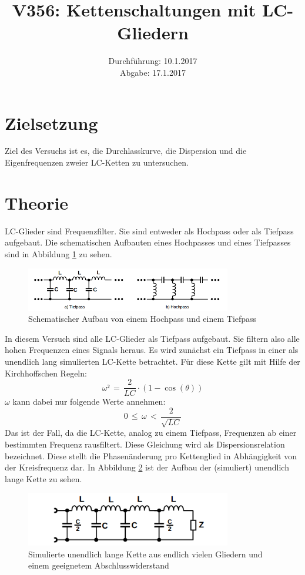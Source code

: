 \documentclass[
  bibliography=totoc,     %
  captions=tableheading,  %
  titlepage=firstiscover, %
]{scrartcl}
\title{V356: Kettenschaltungen mit LC-Gliedern}
\author{
  Simon Schulte
  \texorpdfstring{
    \\
    \href{mailto:simon.schulte@udo.edu}{simon.schulte@udo.edu}
  }{}
  \texorpdfstring{\and}{, }
  Tim Sedlaczek
  \texorpdfstring{
    \\
    \href{mailto:tim.sedlaczek@udo.edu}{tim.sedlaczek@udo.edu}
  }{}
}
\date{Durchführung: 10.1.2017\\
      Abgabe: 17.1.2017}
\begin{document}
\maketitle
\thispagestyle{empty}
\tableofcontents
\newpage
\section{Zielsetzung}
\label{zielsetzung}
Ziel des Versuchs ist es, die Durchlasskurve, die Dispersion und die
Eigenfrequenzen zweier LC-Ketten zu untersuchen.
\section{Theorie}
\label{theorie}
LC-Glieder sind Frequenzfilter. Sie sind entweder als Hochpass oder als Tiefpass
aufgebaut. Die schematischen Aufbauten eines Hochpasses und eines Tiefpasses sind
in Abbildung \ref{fig:V3563} zu sehen.
\begin{figure}[htb]
  \centering
  \includegraphics[width=0.8\textwidth]{V3563.png}
  \caption{Schematischer Aufbau von einem Hochpass und einem Tiefpass}
  \label{fig:V3563}
\end{figure}
In diesem Versuch sind alle LC-Glieder als Tiefpass aufgebaut. Sie filtern also
alle hohen Frequenzen eines Signals heraus. Es wird zunächst ein Tiefpass in
einer als unendlich lang simulierten LC-Kette betrachtet. Für diese Kette gilt
mit Hilfe der Kirchhoffschen Regeln:
\begin{equation}
  \omega²\,=\,\frac{2}{LC}\cdot(1-\cos(\theta))
\end{equation}
$\omega$ kann dabei nur folgende Werte annehmen:
\begin{equation}
  0\,\le\,\omega\,<\,\frac{2}{\sqrt{LC}}
\end{equation}
Das ist der Fall, da die LC-Kette, analog zu einem Tiefpass, Frequenzen ab einer
bestimmten Frequenz rausfiltert.
Diese Gleichung wird als Dispersionsrelation bezeichnet. Diese stellt die
Phasenänderung pro Kettenglied in Abhängigkeit von der Kreisfrequenz dar.
In Abbildung \ref{fig:V3566} ist der Aufbau der (simuliert) unendlich lange
Kette zu sehen.
\begin{figure}[htb]
  \centering
  \includegraphics[width=0.8\textwidth]{V3566.png}
  \caption{Simulierte unendlich lange Kette aus endlich vielen Gliedern und einem geeignetem Abschlusswiderstand}
  \label{fig:V3566}
\end{figure}
\end{document}
